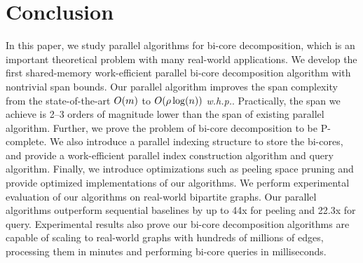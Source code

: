 \section{Conclusion}
In this paper, we study parallel algorithms for bi-core decomposition, which is an important theoretical problem with many real-world applications. We develop the first shared-memory work-efficient parallel bi-core decomposition algorithm with nontrivial span bounds. Our parallel algorithm improves the span complexity from the state-of-the-art $O(m)$ to $O(\rho \log(n))$ \textit{w.h.p.}. Practically, the span we achieve is 2--3 orders of magnitude lower than the span of existing parallel algorithm. Further, we prove the problem of bi-core decomposition to be P-complete. We also introduce a parallel indexing structure to store the bi-cores, and provide a work-efficient parallel index construction algorithm and query algorithm. Finally, we introduce optimizations such as peeling space pruning and provide optimized implementations of our algorithms. We perform experimental evaluation of our algorithms on real-world bipartite graphs. Our parallel algorithms outperform sequential baselines by up to 44x for peeling and 22.3x for query. Experimental results also prove our bi-core decomposition algorithms are capable of scaling to real-world graphs with hundreds of millions of edges, processing them in minutes and performing bi-core queries in milliseconds. 

